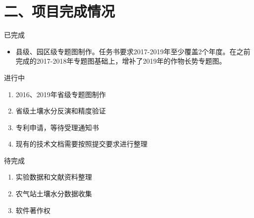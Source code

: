 \documentclass{beamer}
\begin{document}
\section{二、项目完成情况}
\begin{frame}{已完成}
\begin{itemize}
	\item 县级、园区级专题图制作。任务书要求2017-2019年至少覆盖2个年度。在之前完成的2017-2018年专题图基础上，增补了2019年的作物长势专题图。
\end{itemize}
\end{frame}
\begin{frame}{进行中}
	\begin{enumerate}
		\item 2016、2019年省级专题图制作
		\item 省级土壤水分反演和精度验证
		\item 专利申请，等待受理通知书
		\item 现有的技术文档需要按照提交要求进行整理
	\end{enumerate}
\end{frame}
\begin{frame}{待完成}
	\begin{enumerate}
		\item 实验数据和文献资料整理
		\item 农气站土壤水分数据收集
		\item 软件著作权
	\end{enumerate}
\end{frame}
\end{document}
